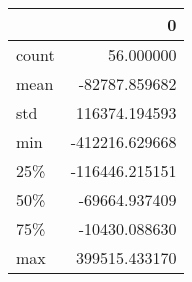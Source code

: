 \begin{tabular}{lr}
\toprule
{} &              0 \\
\midrule
count &      56.000000 \\
mean  &  -82787.859682 \\
std   &  116374.194593 \\
min   & -412216.629668 \\
25\%   & -116446.215151 \\
50\%   &  -69664.937409 \\
75\%   &  -10430.088630 \\
max   &  399515.433170 \\
\bottomrule
\end{tabular}
